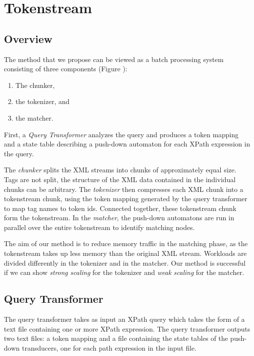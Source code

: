 \section{Tokenstream}\label{sec:yourmethod}


\subsection{Overview}

The method that we propose can be viewed as a batch processing system consisting
of three components (Figure ):

\begin{enumerate}
\item The chunker,
\item the tokenizer, and
\item the matcher.
\end{enumerate}

First, a \emph{Query Transformer} analyzes the query and produces a token
mapping and a state table describing a push-down automaton for each XPath
expression in the query.

The \emph{chunker} splits the XML streams into chunks of approximately equal
size. Tags are not split, the structure of the XML data contained in the
individual chunks can be arbitrary. The \emph{tokenizer} then compresses each
XML chunk into a tokenstream chunk, using the token mapping generated by the
query transformer to map tag names to token ids. Connected together, these
tokenstream chunk form the tokenstream. In the \emph{matcher}, the push-down
automatons are run in parallel over the entire tokenstream to identify matching
nodes.

The aim of our method is to reduce memory traffic in the matching phase, as the
tokenstream takes up less memory than the original XML stream. Workloads are
divided differently in the tokenizer and in the matcher. Our method is
successful if we can show \emph{strong scaling} for the tokenizer and \emph{weak
scaling} for the matcher.

\subsection{Query Transformer}

The query transformer takes as input an XPath query which takes the form of a
text file containing one or more XPath expression. The query transformer outputs
two text files: a token mapping and a file containing the state tables of
the push-down transducers, one for each path expression in the input file.

